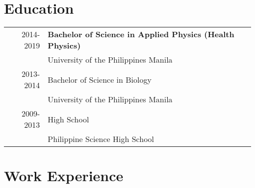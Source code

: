 \documentclass[a4paper,10pt]{article}
\begin{document}
\section{\normalsize Education}
\begin{tabular}{rl}	
\footnotesize 2014-2019     & \textbf{\footnotesize Bachelor of Science in Applied Physics (Health Physics)}\\ 
                            & \footnotesize University of the Philippines Manila\\
\footnotesize 2013-2014     & \footnotesize Bachelor of Science in Biology\\ & \footnotesize University of the Philippines Manila\\
\footnotesize 2009-2013     & \footnotesize High School\\ 
                            & \footnotesize Philippine Science High School\\

\end{tabular}

\section{\normalsize Work Experience}
\end{document}
